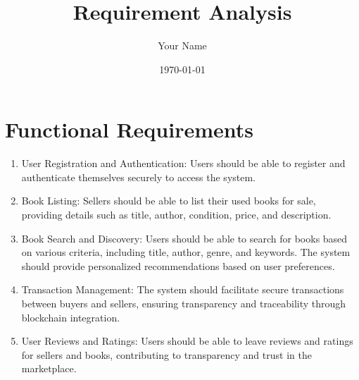 \documentclass{article}
\title{Requirement Analysis}
\author{Your Name}
\date{\today}
\begin{document}
\maketitle

\section{Functional Requirements}
\begin{enumerate}[label=\arabic*.]
    \item User Registration and Authentication: Users should be able to register and authenticate themselves securely to access the system.
    \item Book Listing: Sellers should be able to list their used books for sale, providing details such as title, author, condition, price, and description.
    \item Book Search and Discovery: Users should be able to search for books based on various criteria, including title, author, genre, and keywords. The system should provide personalized recommendations based on user preferences.
    \item Transaction Management: The system should facilitate secure transactions between buyers and sellers, ensuring transparency and traceability through blockchain integration.
    \item User Reviews and Ratings: Users should be able to leave reviews and ratings for sellers and books, contributing to transparency and trust in the marketplace.
\end{enumerate}
\end{document}
